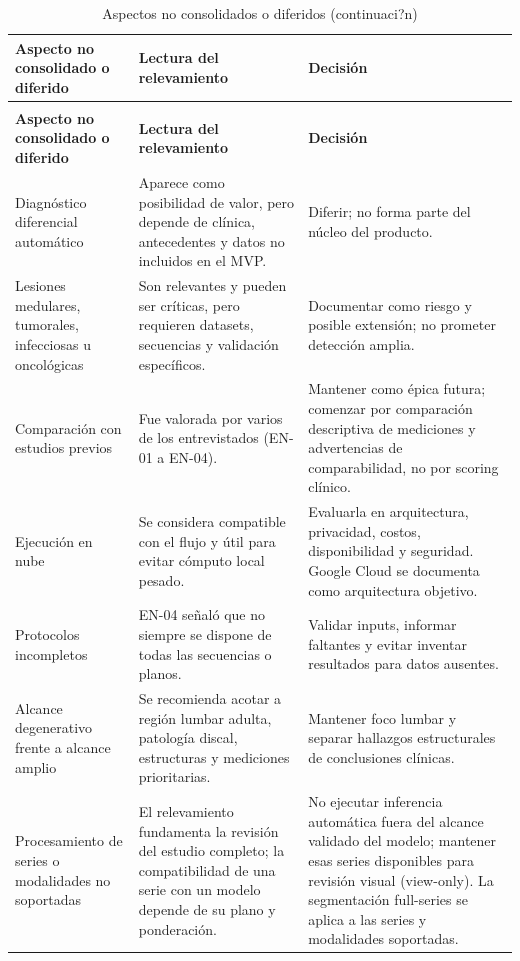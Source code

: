 {\small
\setlength{\LTleft}{0pt}
\setlength{\LTright}{0pt}
\renewcommand{\arraystretch}{1.18}
\begin{longtable}{p{} p{} p{}}
\caption{Aspectos no consolidados o diferidos}\label{tab:user-research-diferidos}\\
\hline
\textbf{Aspecto no consolidado o diferido} & \textbf{Lectura del relevamiento} & \textbf{Decisión} \\
\hline
\endfirsthead
\caption[]{Aspectos no consolidados o diferidos (continuaci?n)}\\
\hline
\textbf{Aspecto no consolidado o diferido} & \textbf{Lectura del relevamiento} & \textbf{Decisión} \\
\hline
\endhead
\hline
\endfoot
Diagnóstico diferencial automático & Aparece como posibilidad de valor, pero depende de clínica, antecedentes y datos no incluidos en el MVP. & Diferir; no forma parte del núcleo del producto. \\
Lesiones medulares, tumorales, infecciosas u oncológicas & Son relevantes y pueden ser críticas, pero requieren datasets, secuencias y validación específicos. & Documentar como riesgo y posible extensión; no prometer detección amplia. \\
Comparación con estudios previos & Fue valorada por varios de los entrevistados (EN-01 a EN-04). & Mantener como épica futura; comenzar por comparación descriptiva de mediciones y advertencias de comparabilidad, no por scoring clínico. \\
Ejecución en nube & Se considera compatible con el flujo y útil para evitar cómputo local pesado. & Evaluarla en arquitectura, privacidad, costos, disponibilidad y seguridad. Google Cloud se documenta como arquitectura objetivo. \\
Protocolos incompletos & EN-04 señaló que no siempre se dispone de todas las secuencias o planos. & Validar inputs, informar faltantes y evitar inventar resultados para datos ausentes. \\
Alcance degenerativo frente a alcance amplio & Se recomienda acotar a región lumbar adulta, patología discal, estructuras y mediciones prioritarias. & Mantener foco lumbar y separar hallazgos estructurales de conclusiones clínicas. \\
Procesamiento de series o modalidades no soportadas & El relevamiento fundamenta la revisión del estudio completo; la compatibilidad de una serie con un modelo depende de su plano y ponderación. & No ejecutar inferencia automática fuera del alcance validado del modelo; mantener esas series disponibles para revisión visual (view-only). La segmentación full-series se aplica a las series y modalidades soportadas. \\
\hline
\end{longtable}
}

